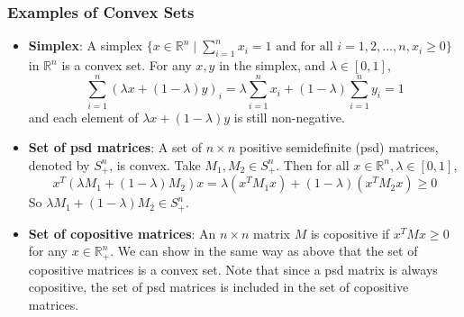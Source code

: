 \begin{frame}\frametitle{Examples of Convex Sets}
    \begin{itemize}
        \item \textbf{Simplex}: A simplex $\{x \in \mathbb{R}^n \mid \sum_{i=1}^{n} x_i = 1 \text{ and for all } i=1,2, ... , n, x_i \geq 0\}$ in $\mathbb{R}^n$ is a convex set.
        For any $x,y$ in the simplex, and $\lambda \in [0,1]$,
        \begin{equation*}
            \sum_{i=1}^{n} (\lambda x + (1-\lambda) y)_i = \lambda \sum_{i=1}^{n} x_i + (1-\lambda) \sum_{i=1}^{n} y_i = 1
        \end{equation*}
        and each element of $\lambda x + (1-\lambda) y$ is still non-negative.
        \item \textbf{Set of psd matrices}: A set of $n \times n$ positive semidefinite (psd) matrices, denoted by $S_{+}^{n}$, is convex. 
        Take $M_1, M_2 \in S_{+}^{n}$. Then for all $x \in \mathbb{R}^n, \lambda \in [0,1]$,
        \begin{equation*}
            x^T (\lambda M_1 + (1-\lambda) M_2) x = \lambda (x^T M_1 x) + (1-\lambda) (x^T M_2 x) \geq 0
        \end{equation*}
        So $\lambda M_1 + (1-\lambda) M_2 \in S_{+}^{n}$.
        \item \textbf{Set of copositive matrices}: An $n \times n$ matrix $M$ is copositive if $x^T M x \geq 0$ for any $x \in \mathbb{R}_{+}^{n}$. 
        We can show in the same way as above that the set of copositive matrices is a convex set. Note that since a psd matrix is always copositive, 
        the set of psd matrices is included in the set of copositive matrices.
    \end{itemize}
\end{frame}

